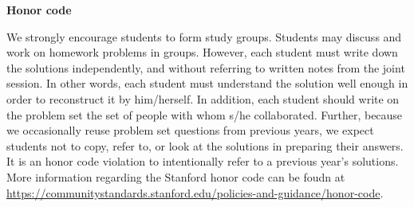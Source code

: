 {\bf Honor code}

We strongly encourage students to form study groups. Students may discuss and
work on homework problems in groups. However, each student must write down the
solutions independently, and without referring to written notes from the joint
session. In other words, each student must understand the solution well enough
in order to reconstruct it by him/herself. In addition, each student should
write on the problem set the set of people with whom s/he collaborated. Further,
because we occasionally reuse problem set questions from previous years, we
expect students not to copy, refer to, or look at the solutions in preparing
their answers. It is an honor code violation to intentionally refer to a
previous year's solutions.  More information regarding the Stanford honor code
can be foudn at \url{https://communitystandards.stanford.edu/policies-and-guidance/honor-code}.